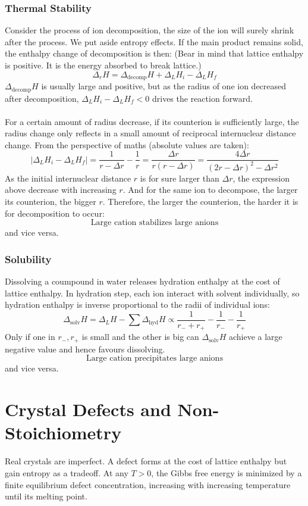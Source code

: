 \subsubsection{Thermal Stability}
%
Consider the process of ion decomposition, the size of the ion will surely shrink after the process.
We put aside entropy effects.
If the main product remains solid, the enthalpy change of decomposition is then: 
(Bear in mind that lattice enthalpy is positive. It is the energy absorbed to break lattice.)
%
\[
	\Delta_rH = \Delta_{\text{decomp}}H + \Delta_LH_i - \Delta_LH_f
\]
%
$\Delta_{\text{decomp}}H$ is usually large and positive, 
but as the radius of one ion decreased after decomposition, 
$\Delta_LH_i - \Delta_LH_f <0$ drives the reaction forward.\\ \\
%
For a certain amount of radius decrease, if its counterion is sufficiently large, 
the radius change only reflects in a small amount of reciprocal internuclear distance change.
From the perspective of maths (absolute values are taken):
%
\[ 
	|\Delta_LH_i - \Delta_LH_f| = 
	\frac{1}{r - \Delta r} - \frac{1}{r}  = 
	\frac{\Delta r}{r(r-\Delta r)} = \frac{4\Delta r}{(2r-\Delta r)^2 - \Delta r^2}
\]
%
As the initial internuclear distance $r$ is for sure larger than $\Delta r$, 
the expression above decrease with increasing $r$. 
And for the same ion to decompose, the larger its counterion, the bigger $r$.
Therefore, the larger the counterion, the harder it is for decomposition to occur:
%
\[\boxed{\text{
	Large\ cation\ stabilizes\ large\ anions
}}\]
and vice versa.
%
\subsubsection{Solubility}
%
Dissolving a coumpound in water releases hydration enthalpy at the cost of lattice enthalpy. 
In hydration step, each ion interact with solvent individually, 
so hydration enthalpy is inverse proportional to the radii of individual ions:
%
\[
	\Delta_{\text{solv}}H = \Delta_LH - \sum\Delta_{\text{hyd}}H \propto \frac{1}{r_-+r_+} - \frac{1}{r_-} - \frac{1}{r_+}
\]
Only if one in $r_-,r_+$ is small and the other is big can $\Delta_{\text{solv}}H$ achieve a large negative value 
and hence favours dissolving.
%
\[\boxed{\text{
	Large\ cation\ precipitates\ large\ anions
}}\]
and vice versa.


\section{Crystal Defects and Non-Stoichiometry}
%
Real crystals are imperfect. A defect forms at the cost of lattice enthalpy but gain entropy as a tradeoff. 
At any $T>0$, the Gibbs free energy is minimized by a finite equilibrium defect concentration, 
increasing with increasing temperature until its melting point.
%
